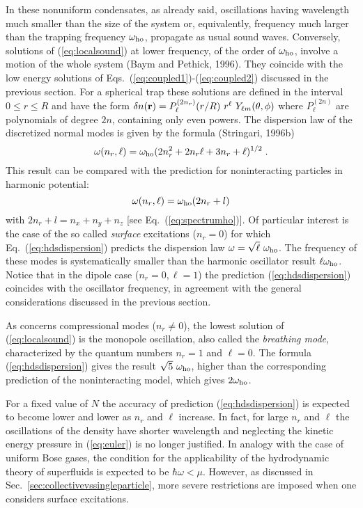 In these nonuniform condensates, as already said,  oscillations 
having wavelength much smaller than the size of the system or, 
equivalently, frequency much larger than the trapping frequency 
$\omega_{\rm ho}$, propagate as usual sound waves. Conversely, 
solutions of (\ref{eq:localsound}) at lower frequency, of the 
order of $\omega_{\rm ho}$, involve a motion of the whole system 
(Baym and Pethick, 1996). They coincide with the low energy 
solutions of Eqs.~(\ref{eq:coupled1})-(\ref{eq:coupled2}) discussed in 
the previous section.  For a spherical trap these solutions  
are defined   in the interval $0 \le r \le R$ and have the form
$\delta n({\bf r}) = P^{(2n_r)}_{\ell}(r/R)\  r^{\ell} \
Y_{\ell m}(\theta,\phi)$ where $P^{(2n)}_{\ell}$ are  polynomials of
degree $2n$, containing only even powers. The dispersion  law of the
discretized normal modes is given by the formula (Stringari, 1996b)
\begin{equation}
\omega (n_r,\ell) = \omega_{\rm ho} (2n_r^2 + 
2n_r\ell + 3n_r +\ell)^{1/2} \; .
\label{eq:hdsdispersion}
\end{equation}
This result can be compared with the prediction for noninteracting
particles in harmonic potential:
\begin{equation}
\omega (n_r,\ell) = \omega_{\rm ho} (2n_r + l)
\label{eq:frequencyho}
\end{equation}
with $2n_r+l = n_x+n_y+n_z$ [see Eq.~(\ref{eq:spectrumho})]. Of
particular interest is the case of the  so called {\it surface}
excitations ($n_r=0$) for which  Eq.~(\ref{eq:hdsdispersion}) predicts
the dispersion law  $\omega = \sqrt{\ell}\ \omega_{\rm ho}$.
The frequency of these modes is  systematically  smaller than the harmonic
oscillator result $\ell\omega_{\rm ho}$. Notice that in the dipole case
($n_r=0, \ell=1$) the prediction (\ref{eq:hdsdispersion}) coincides with 
the oscillator frequency, in agreement with the general considerations 
discussed in the previous section.

As concerns compressional modes ($n_r \ne 0$), the lowest solution of
(\ref{eq:localsound}) is the monopole oscillation, also called the {\it
breathing  mode}, characterized  by the quantum numbers $n_r=1$ and
$\ell=0$. The  formula  (\ref{eq:hdsdispersion}) gives the
result $\sqrt{5}\ \omega_{\rm ho}$, higher  than the corresponding
prediction of  the noninteracting model, which gives $2\omega_{\rm ho}$.

For a fixed value of $N$ the accuracy of prediction (\ref{eq:hdsdispersion})
is expected to become lower and lower as $n_r$ and $\ell$ increase. In fact,
for large $n_r$ and $\ell$ the oscillations of the density have shorter
wavelength and neglecting the kinetic energy pressure in (\ref{eq:euler})
is no longer justified.  In analogy with the  case of uniform Bose gases,
the condition for the applicability of the hydrodynamic theory of superfluids
is expected to be $\hbar \omega < \mu$. However, as discussed in 
Sec.~\ref{sec:collectivevssingleparticle}, more severe restrictions are
imposed when one considers surface excitations.

